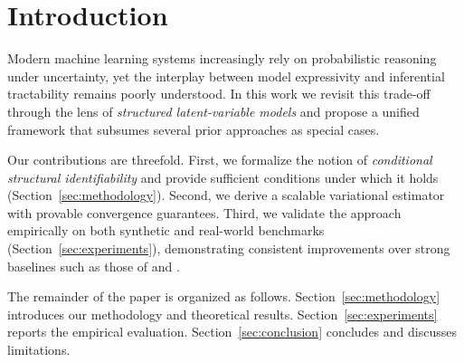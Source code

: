 \section{Introduction}\label{sec:intro}
Modern machine learning systems increasingly rely on probabilistic reasoning under uncertainty, yet the interplay between model expressivity and inferential tractability remains poorly understood.
In this work we revisit this trade-off through the lens of \emph{structured latent-variable models} and propose a unified framework that subsumes several prior approaches as special cases.

Our contributions are threefold.
First, we formalize the notion of \emph{conditional structural identifiability} and provide sufficient conditions under which it holds (Section~\ref{sec:methodology}).
Second, we derive a scalable variational estimator with provable convergence guarantees.
Third, we validate the approach empirically on both synthetic and real-world benchmarks (Section~\ref{sec:experiments}), demonstrating consistent improvements over strong baselines such as those of \citet{einstein} and \citet{latexcompanion}.

The remainder of the paper is organized as follows.
Section~\ref{sec:methodology} introduces our methodology and theoretical results.
Section~\ref{sec:experiments} reports the empirical evaluation.
Section~\ref{sec:conclusion} concludes and discusses limitations.
